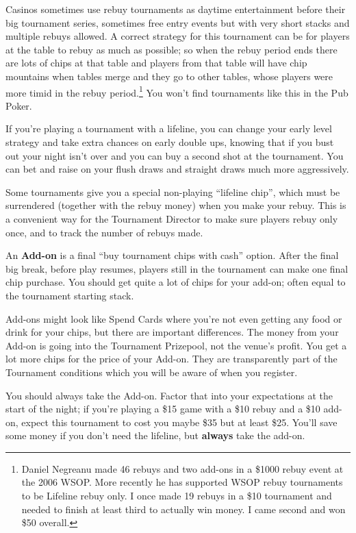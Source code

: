 Casinos sometimes use rebuy tournaments as daytime entertainment
before their big tournament series, sometimes free entry events
but with very short stacks and multiple rebuys allowed. A correct
strategy for this tournament can be for players at the table
to rebuy as much as possible; so when the rebuy period ends there
are lots of chips at that table and players from that table will
have chip mountains when tables merge and they go to
other tables, whose players were more timid in the rebuy
period.\footnote{Daniel Negreanu made 46 rebuys and two add-ons
  in a \$1000 rebuy event at the 2006 WSOP. More recently he has
  supported WSOP rebuy tournaments to be Lifeline rebuy only. I once
  made 19 rebuys in a \$10 tournament and needed to finish at least
  third to actually win money. I came second and won \$50 overall.} You
won't find tournaments like this in the Pub Poker.

If you're playing a tournament with a lifeline, you can change
your early level strategy and take extra chances on early
double ups, knowing that if you bust out your night isn't over and
you can buy a second shot at the tournament. You can bet and raise
on your flush draws and straight draws much more aggressively.

Some tournaments give you a special non-playing ``lifeline chip'',
which must be surrendered (together with the rebuy money) when you
make your rebuy. This is a convenient way for the Tournament
Director to make sure players rebuy only once, and to track the number
of rebuys made.

An \textbf{Add-on} is a final ``buy tournament chips with cash''
option. After the final big break, before play resumes, players still
in the tournament can make one final chip purchase. You should get
quite a lot of chips for your add-on; often equal to the tournament
starting stack.

Add-ons might look like Spend Cards where you're not even
getting any food or drink for your chips, but there are important
differences. The money from your Add-on is going into the Tournament
Prizepool, not the venue's profit. You get a lot more chips for
the price of your Add-on. They are transparently part of the
Tournament conditions which you will be aware of when you register.

You should always take the Add-on. Factor that into your expectations
at the start of the night; if you're playing a \$15 game with a \$10
rebuy and a \$10 add-on, expect this tournament to cost you maybe
\$35 but at least \$25. You'll save some money if you don't
need the lifeline, but \textbf{always} take the add-on.

